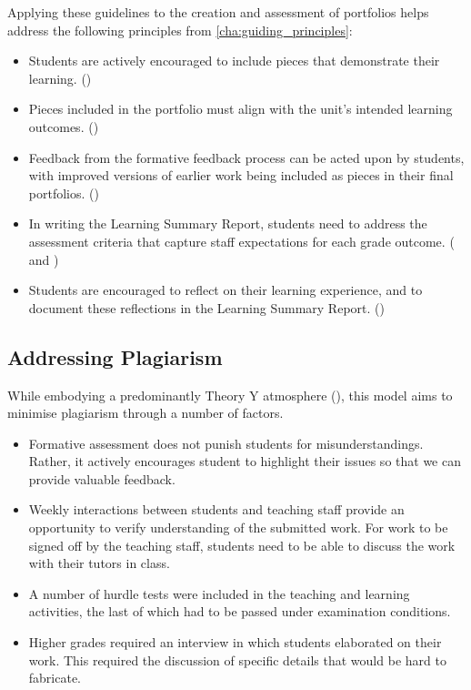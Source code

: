 Applying these guidelines to the creation and assessment of portfolios helps address the following principles from \cref{cha:guiding_principles}:

\begin{itemize}[noitemsep,nolistsep]
	\item Students are actively encouraged to include pieces that demonstrate their learning.  ()
	\item Pieces included in the portfolio must align with the unit's intended learning outcomes. ()
	\item Feedback from the formative feedback process can be acted upon by students, with improved versions of earlier work being included as pieces in their final portfolios. ()
	\item In writing the Learning Summary Report, students need to address the assessment criteria that capture staff expectations for each grade outcome. ( and )
	\item Students are encouraged to reflect on their learning experience, and to document these reflections in the Learning Summary Report. ()
\end{itemize}



\clearpage
\subsection{Addressing Plagiarism} %
\label{sub:addressing_plagiarism}

While embodying a predominantly Theory Y atmosphere (), this model aims to minimise plagiarism through a number of factors.
\begin{itemize}[noitemsep,nolistsep]
	\item Formative assessment does not punish students for misunderstandings. Rather, it actively encourages student to highlight their issues so that we can provide valuable feedback. 
	\item Weekly interactions between students and teaching staff provide an opportunity to verify understanding of the submitted work. For work to be signed off by the teaching staff, students need to be able to discuss the work with their tutors in class.
	\item A number of hurdle tests were included in the teaching and learning activities, the last of which had to be passed under examination conditions.
	\item Higher grades required an interview in which students elaborated on their work. This required the discussion of specific details that would be hard to fabricate.
\end{itemize}

